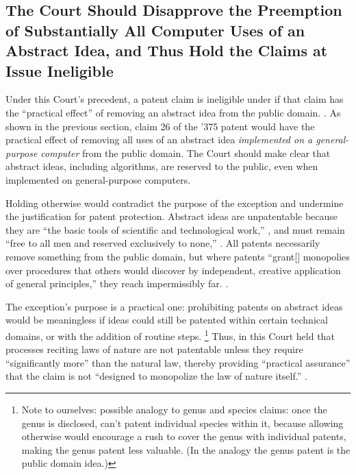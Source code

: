 \documentclass{scotus}
\begin{document}
\subsection{The Court Should Disapprove the Preemption of Substantially All
Computer Uses of an Abstract Idea, and Thus Hold the Claims at Issue Ineligible}

Under this Court's precedent, a patent claim is ineligible under  if
that claim has the ``practical effect'' of removing an abstract idea from the
public domain.  .  As shown in the previous section,
claim 26 of the '375 patent would have the practical effect of removing all uses
of an abstract idea \emph{implemented on a general-purpose computer} from the
public domain. The Court should make clear that abstract ideas, including
algorithms, are reserved to the public, even when implemented on general-purpose
computers.

Holding otherwise would contradict the purpose of the exception and undermine the
justification for patent protection.  Abstract ideas are unpatentable because they
are ``the basic tools of scientific and technological work,'' , and must remain ``free to all men and reserved exclusively to none,''
. All patents
necessarily remove something from the public domain, but where patents ``grant[]
monopolies over procedures that others would discover by independent, creative
application of general principles,'' they reach impermissibly far. .

The exception's purpose is a practical one:  prohibiting patents on abstract ideas
would be meaningless if ideas could still be patented within certain technical
domains, or with the addition of routine steps. \footnote{Note to ourselves: 
possible analogy to genus and species claims:  once the genus is disclosed, can’t
patent individual species within it, because allowing otherwise would encourage a
rush to cover the genus with individual patents, making the genus patent less
valuable.  (In the analogy the genus patent is the public domain idea.)} Thus, in
 this Court held that processes reciting laws of nature are not
patentable unless they require ``significantly more'' than the natural law,
thereby providing ``practical assurance'' that the claim is not ``designed to
monopolize the law of nature itself.''  .
\end{document}
